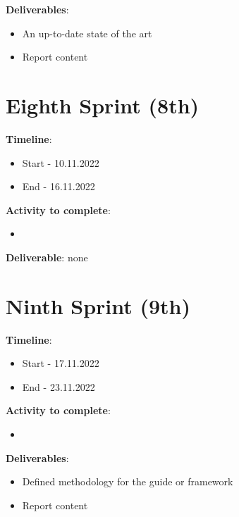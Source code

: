 \textbf{Deliverables}: 
\begin{itemize}
    \item An up-to-date state of the art
    \item Report content
\end{itemize}

\section{Eighth Sprint (8th)}
\label{sec:planning_eigth}

\textbf{Timeline}:
\begin{itemize}
    \item Start - 10.11.2022
	\item End - 16.11.2022
\end{itemize}

\textbf{Activity to complete}:
\begin{itemize}
    \item {}
\end{itemize}

\textbf{Deliverable}: none

\section{Ninth Sprint (9th)}
\label{sec:planning_ninth}

\textbf{Timeline}:
\begin{itemize}
    \item Start - 17.11.2022
	\item End - 23.11.2022
\end{itemize}

\textbf{Activity to complete}:
\begin{itemize}
    \item {}
\end{itemize}

\textbf{Deliverables}: 
\begin{itemize}
    \item Defined methodology for the guide or \gls{framework}
    \item Report content
\end{itemize}

